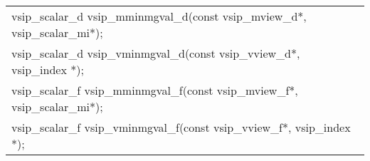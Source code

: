 \\\cvsiplh
\afh
{
\ttfamily
\\\hspace*{.04\textwidth}\begin{tabular}[H]{l}
vsip\_scalar\_d vsip\_mminmgval\_d(const vsip\_mview\_d*, vsip\_scalar\_mi*);\\
vsip\_scalar\_d vsip\_vminmgval\_d(const vsip\_vview\_d*, vsip\_index *);\\
vsip\_scalar\_f vsip\_mminmgval\_f(const vsip\_mview\_f*, vsip\_scalar\_mi*);\\
vsip\_scalar\_f vsip\_vminmgval\_f(const vsip\_vview\_f*, vsip\_index *);\\
\end{tabular}
}
\\\pyjvsiph
%
%
%
